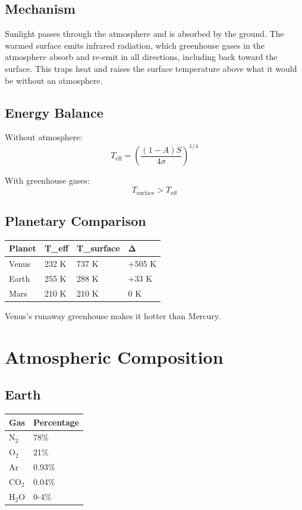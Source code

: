\documentclass[
  11pt,
  letterpaper,
  twoside,
  openright]{book}
\begin{document}
\subsection{Mechanism}\label{mechanism}

Sunlight passes through the atmosphere and is absorbed by the ground.
The warmed surface emits infrared radiation, which greenhouse gases in
the atmosphere absorb and re-emit in all directions, including back
toward the surface. This traps heat and raises the surface temperature
above what it would be without an atmosphere.

\subsection{Energy Balance}\label{energy-balance}

Without atmosphere: \[
T_{\text{eff}} = \left(\frac{(1-A)S}{4\sigma}\right)^{1/4}
\]

With greenhouse gases: \[
T_{\text{surface}} > T_{\text{eff}}
\]

\subsection{Planetary Comparison}\label{planetary-comparison}

\begin{longtable}[]{@{}llll@{}}
\toprule\noalign{}
Planet & T\_eff & T\_surface & Δ \\
\midrule\noalign{}
\endhead
\bottomrule\noalign{}
\endlastfoot
Venus & 232 K & 737 K & +505 K \\
Earth & 255 K & 288 K & +33 K \\
Mars & 210 K & 210 K & 0 K \\
\end{longtable}

Venus's runaway greenhouse makes it hotter than Mercury.

\section{Atmospheric Composition}\label{atmospheric-composition}

\subsection{Earth}\label{earth}

\begin{longtable}[]{@{}ll@{}}
\toprule\noalign{}
Gas & Percentage \\
\midrule\noalign{}
\endhead
\bottomrule\noalign{}
\endlastfoot
\(\text{N}_2\) & 78\% \\
\(\text{O}_2\) & 21\% \\
Ar & 0.93\% \\
\(\text{CO}_2\) & 0.04\% \\
\(\text{H}_2\text{O}\) & 0-4\% \\
\end{longtable}
\end{document}
